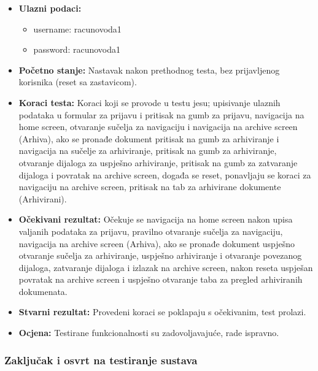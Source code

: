 			\begin{itemize}
				
				\item{\textbf{Ulazni podaci:}}
				\begin{itemize}
					\item{username: racunovoda1}
					\item{password: racunovoda1}
				\end{itemize}
				
				\item{\textbf{Početno stanje:} Nastavak nakon prethodnog testa, bez prijavljenog korisnika (reset sa zastavicom).}
				
				\item{\textbf{Koraci testa:} Koraci koji se provode u testu jesu; upisivanje ulaznih podataka u formular za prijavu i pritisak na gumb za prijavu, navigacija na home screen, otvaranje sučelja za navigaciju i navigacija na archive screen (Arhiva), ako se pronađe dokument pritisak na gumb za arhiviranje i navigacija na sučelje za arhiviranje, pritisak na gumb za arhiviranje, otvaranje dijaloga za uspješno arhiviranje, pritisak na gumb za zatvaranje dijaloga i povratak na archive screen, događa se reset, ponavljaju se koraci za navigaciju na archive screen, pritisak na tab za arhivirane dokumente (Arhivirani).}
				
				\item{\textbf{Očekivani rezultat:} Očekuje se navigacija na home screen nakon upisa valjanih podataka za prijavu, pravilno otvaranje sučelja za navigaciju, navigacija na archive screen (Arhiva), ako se pronađe dokument uspješno otvaranje sučelja za arhiviranje, uspješno arhiviranje i otvaranje povezanog dijaloga, zatvaranje dijaloga i izlazak na archive screen, nakon reseta uspješan povratak na archive screen i uspješno otvaranje taba za pregled arhiviranih dokumenata.}
				
				\item{\textbf{Stvarni rezultat:} Provedeni koraci se poklapaju s očekivanim, test prolazi.}
				
				\item{\textbf{Ocjena:} Testirane funkcionalnosti su zadovoljavajuće, rade ispravno.}
				
			\end{itemize}
			
			\subsubsection{Zaključak i osvrt na testiranje sustava}
			 
